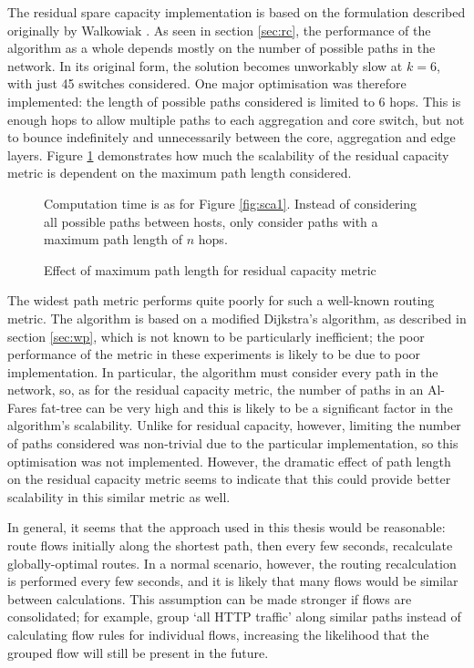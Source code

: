 The residual spare capacity implementation is based on the formulation described originally by Walkowiak \cite{walkowiak:residual}. As seen in section \ref{sec:rc}, the performance of the algorithm as a whole depends mostly on the number of possible paths in the network. In its original form, the solution becomes unworkably slow at $k = 6$, with just 45 switches considered. One major optimisation was therefore implemented: the length of possible paths considered is limited to 6 hops. This is enough hops to allow multiple paths to each aggregation and core switch, but not to bounce indefinitely and unnecessarily between the core, aggregation and edge layers. Figure \ref{fig:sca2} demonstrates how much the scalability of the residual capacity metric is dependent on the maximum path length considered.

\begin{figure}
\centering

\caption{Effect of maximum path length for residual capacity metric}
\label{fig:sca2}
Computation time is as for Figure \ref{fig:sca1}. Instead of considering all possible paths between hosts, only consider paths with a maximum path length of $n$ hops.
\end{figure}

The widest path metric performs quite poorly for such a well-known routing metric. The algorithm is based on a modified Dijkstra's algorithm, as described in section \ref{sec:wp}, which is not known to be particularly inefficient; the poor performance of the metric in these experiments is likely to be due to poor implementation. In particular, the algorithm must consider every path in the network, so, as for the residual capacity metric, the number of paths in an Al-Fares fat-tree can be very high and this is likely to be a significant factor in the algorithm's scalability. Unlike for residual capacity, however, limiting the number of paths considered was non-trivial due to the particular implementation, so this optimisation was not implemented. However, the dramatic effect of path length on the residual capacity metric seems to indicate that this could provide better scalability in this similar metric as well.

In general, it seems that the approach used in this thesis would be reasonable: route flows initially along the shortest path, then every few seconds, recalculate globally-optimal routes. In a normal scenario, however, the routing recalculation is performed every few seconds, and it is likely that many flows would be similar between calculations. This assumption can be made stronger if flows are consolidated; for example, group `all HTTP traffic' along similar paths instead of calculating flow rules for individual flows, increasing the likelihood that the grouped flow will still be present in the future.

